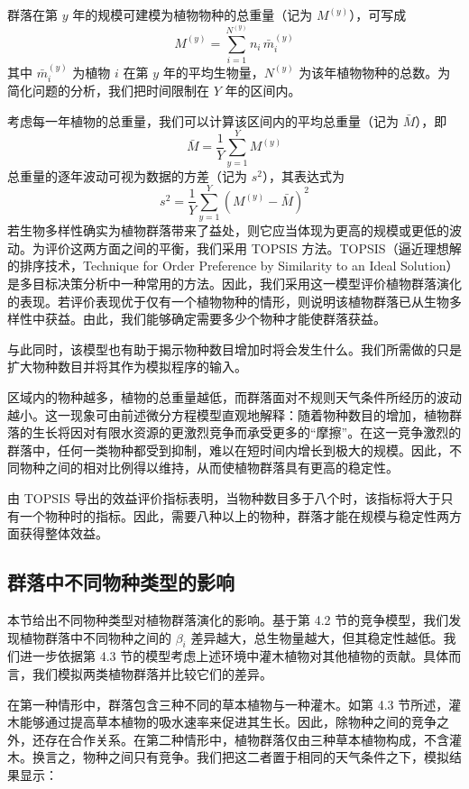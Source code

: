 \documentclass[11pt,a4paper]{ctexart}
\begin{document}
群落在第 $y$ 年的规模可建模为植物物种的总重量（记为 $M^{(y)}$），可写成
\[
M^{(y)}=\sum_{i=1}^{N^{(y)}}n_i\,\bar m_i^{(y)}
\]
其中 $\bar m_i^{(y)}$ 为植物 $i$ 在第 $y$ 年的平均生物量，$N^{(y)}$ 为该年植物物种的总数。为简化问题的分析，我们把时间限制在 $Y$ 年的区间内。

考虑每一年植物的总重量，我们可以计算该区间内的平均总重量（记为 $\bar M$），即
\[
\bar M=\frac{1}{Y}\sum_{y=1}^{Y}M^{(y)}
\]
总重量的逐年波动可视为数据的方差（记为 $s^{2}$），其表达式为
\[
s^{2}=\frac{1}{Y}\sum_{y=1}^{Y}\left(M^{(y)}-\bar M\right)^{2}
\]
若生物多样性确实为植物群落带来了益处，则它应当体现为更高的规模或更低的波动。为评价这两方面之间的平衡，我们采用 TOPSIS 方法。TOPSIS（逼近理想解的排序技术，Technique for Order Preference by Similarity to an Ideal Solution）是多目标决策分析中一种常用的方法。因此，我们采用这一模型评价植物群落演化的表现。若评价表现优于仅有一个植物物种的情形，则说明该植物群落已从生物多样性中获益。由此，我们能够确定需要多少个物种才能使群落获益。

与此同时，该模型也有助于揭示物种数目增加时将会发生什么。我们所需做的只是扩大物种数目并将其作为模拟程序的输入。

区域内的物种越多，植物的总重量越低，而群落面对不规则天气条件所经历的波动越小。这一现象可由前述微分方程模型直观地解释：随着物种数目的增加，植物群落的生长将因对有限水资源的更激烈竞争而承受更多的“摩擦”。在这一竞争激烈的群落中，任何一类物种都受到抑制，难以在短时间内增长到极大的规模。因此，不同物种之间的相对比例得以维持，从而使植物群落具有更高的稳定性。

由 TOPSIS 导出的效益评价指标表明，当物种数目多于八个时，该指标将大于只有一个物种时的指标。因此，需要八种以上的物种，群落才能在规模与稳定性两方面获得整体效益。

\subsection{群落中不同物种类型的影响}

本节给出不同物种类型对植物群落演化的影响。基于第 4.2 节的竞争模型，我们发现植物群落中不同物种之间的 $\beta_i$ 差异越大，总生物量越大，但其稳定性越低。我们进一步依据第 4.3 节的模型考虑上述环境中灌木植物对其他植物的贡献。具体而言，我们模拟两类植物群落并比较它们的差异。

在第一种情形中，群落包含三种不同的草本植物与一种灌木。如第 4.3 节所述，灌木能够通过提高草本植物的吸水速率来促进其生长。因此，除物种之间的竞争之外，还存在合作关系。在第二种情形中，植物群落仅由三种草本植物构成，不含灌木。换言之，物种之间只有竞争。我们把这二者置于相同的天气条件之下，模拟结果显示：
\end{document}
